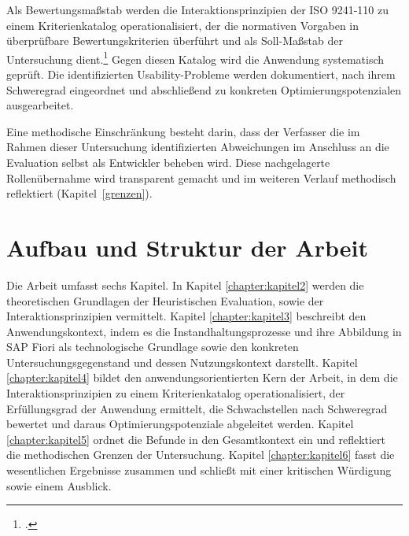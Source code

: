 Als Bewertungsmaßstab werden die Interaktionsprinzipien der ISO 9241-110 zu einem Kriterienkatalog operationalisiert, der die normativen 
Vorgaben in überprüfbare Bewertungskriterien überführt und als Soll-Maßstab der Untersuchung dient.\footcite[Vgl.][Abschnitt~1]{DIN_ISO_9241-110:2020} Gegen
diesen Katalog wird die Anwendung systematisch geprüft. Die identifizierten Usability-Probleme werden dokumentiert, nach ihrem Schweregrad 
eingeordnet und abschließend zu konkreten Optimierungspotenzialen ausgearbeitet.

Eine methodische Einschränkung besteht darin, dass der Verfasser die im Rahmen dieser Untersuchung 
identifizierten Abweichungen im Anschluss an die Evaluation selbst als Entwickler beheben wird. 
Diese nachgelagerte Rollenübernahme wird transparent gemacht und im weiteren Verlauf methodisch 
reflektiert (Kapitel~\ref{grenzen}).

\section{Aufbau und Struktur der Arbeit}
\label{section:struktur}
Die Arbeit umfasst sechs Kapitel. In Kapitel \ref{chapter:kapitel2} werden die theoretischen Grundlagen der Heuristischen Evaluation, sowie der 
Interaktionsprinzipien vermittelt. Kapitel \ref{chapter:kapitel3} beschreibt den Anwendungskontext, indem es die Instandhaltungsprozesse und ihre 
Abbildung in SAP Fiori als technologische Grundlage sowie den konkreten Untersuchungsgegenstand und dessen Nutzungskontext darstellt. 
Kapitel \ref{chapter:kapitel4} bildet den anwendungsorientierten Kern der Arbeit, in dem die Interaktionsprinzipien zu einem Kriterienkatalog 
operationalisiert, der Erfüllungsgrad der Anwendung ermittelt, die Schwachstellen nach Schweregrad bewertet und daraus 
Optimierungspotenziale abgeleitet werden. Kapitel \ref{chapter:kapitel5} ordnet die Befunde in den Gesamtkontext ein und reflektiert die methodischen 
Grenzen der Untersuchung. Kapitel \ref{chapter:kapitel6} fasst die wesentlichen Ergebnisse zusammen und schließt mit einer kritischen Würdigung sowie einem 
Ausblick.